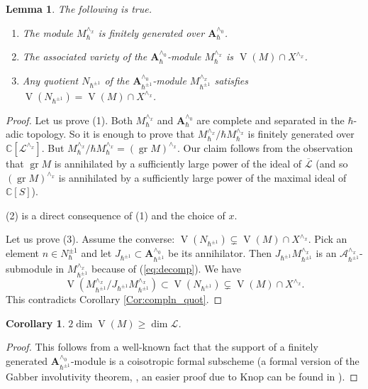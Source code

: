 \documentclass[12pt]{amsart}
\newcommand{\A}{\mathcal{A}}
\newcommand{\K}{\mathbb{C}}
\newcommand{\VA}{\operatorname{V}}
\newcommand{\gr}{\operatorname{gr}}
\newcommand{\Weyl}{\mathbf{A}}
\newtheorem{Cor}[Thm]{Corollary}
\newtheorem{Lem}[Thm]{Lemma}
\theoremstyle{definition}
\begin{document}
\begin{Lem}\label{Lem:fin_gen}
The following is true.
\begin{enumerate}
\item  The module $M_\hbar^{\wedge_x}$ is finitely generated over $\Weyl_\hbar^{\wedge_0}$.
\item  The associated variety of the $\Weyl_\hbar^{\wedge_0}$-module $M_{\hbar}^{\wedge_x}$
is $\VA(M)\cap X^{\wedge_x}$.
\item Any quotient $N_{\hbar^{\pm 1}}$ of the $\Weyl_{\hbar^{\pm 1}}^{\wedge_0}$-module $M^{\wedge_x}_{\hbar^{\pm 1}}$
satisfies $\VA(N_{\hbar^{\pm 1}})=\VA(M)\cap X^{\wedge_x}$.
\end{enumerate}
\end{Lem}
\begin{proof}
Let us prove (1).
Both $M_{\hbar}^{\wedge_x}$ and $\Weyl_\hbar^{\wedge_0}$ are complete and separated in
the $\hbar$-adic topology. So it is enough to prove that $M_{\hbar}^{\wedge_x}/\hbar M_{\hbar}^{\wedge_x}$
is finitely generated over $\K[\mathcal{L}^{\wedge_x}]$. But
$M_{\hbar}^{\wedge_x}/\hbar M_{\hbar}^{\wedge_x}=(\gr M)^{\wedge_x}$. Our claim follows from the observation
that $\gr M$ is annihilated by  a sufficiently large power of the ideal of $\overline{\mathcal{L}}$
(and so $(\gr M)^{\wedge_x}$ is annihilated by a sufficiently large power of the maximal ideal
of $\K[S]$).

(2) is a direct consequence of (1) and the choice of $x$.

Let us prove (3). Assume the converse: $\VA(N_{\hbar^{\pm 1}})\subsetneq\VA(M)\cap X^{\wedge_x}$.
Pick an element $n\in N_{\hbar}^{\pm 1}$ and let $J_{\hbar^{\pm 1}}\subset \Weyl_{\hbar^{\pm 1}}^{\wedge_0}$
be its annihilator. Then $J_{\hbar^{\pm 1}}M^{\wedge_x}_{\hbar^{\pm 1}}$ is an $\A^{\wedge_x}_{\hbar^{\pm 1}}$-submodule
in $M^{\wedge_x}_{\hbar^{\pm 1}}$ because of (\ref{eq:decomp}).
We have
$$\VA(M^{\wedge_x}_{\hbar^{\pm 1}}/J_{\hbar^{\pm 1}}M^{\wedge_x}_{\hbar^{\pm 1}})\subset \VA(N_{\hbar^{\pm 1}})
\subsetneq \VA(M)\cap X^{\wedge_x}.$$
This contradicts Corollary \ref{Cor:compln_quot}.
\end{proof}

\begin{Cor}\label{Cor:cois}
$2\dim \VA(M)\geqslant \dim \mathcal{L}$.
\end{Cor}
\begin{proof}
This follows from a well-known fact that the support of a finitely generated
$\Weyl^{\wedge_0}_{\hbar^{\pm 1}}$-module is a coisotropic formal subscheme
(a formal version of the Gabber involutivity theorem, \cite{Ga}, an easier
proof due to Knop can be found in \cite[Section 1.2]{Ginzburg_D_mod}).
\end{proof}
\end{document}

